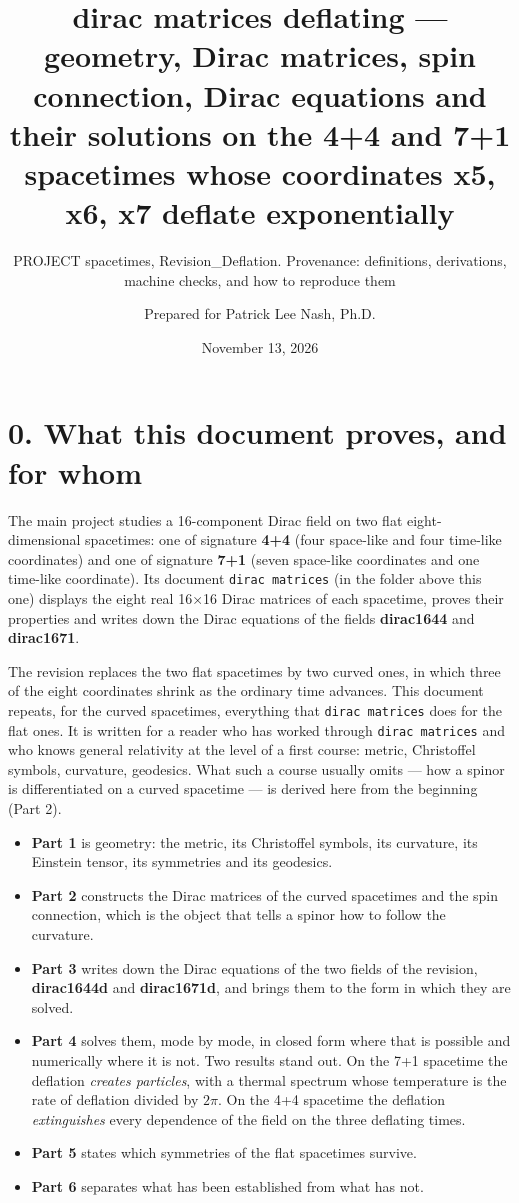 \documentclass[
  10pt,
]{article}
\title{dirac matrices deflating --- geometry, Dirac matrices, spin
connection, Dirac equations and their solutions on the 4+4 and 7+1
spacetimes whose coordinates x5, x6, x7 deflate exponentially}
\subtitle{PROJECT spacetimes, Revision\_Deflation. Provenance:
definitions, derivations, machine checks, and how to reproduce them}
\author{Prepared for Patrick Lee Nash, Ph.D.}
\date{November 13, 2026}
\providecommand{\tightlist}{%
  \setlength{\itemsep}{0pt}\setlength{\parskip}{0pt}}
\begin{document}
\maketitle

\hypertarget{what-this-document-proves-and-for-whom}{%
\section{0. What this document proves, and for
whom}\label{what-this-document-proves-and-for-whom}}

The main project studies a 16-component Dirac field on two flat
eight-dimensional spacetimes: one of signature \textbf{4+4} (four
space-like and four time-like coordinates) and one of signature
\textbf{7+1} (seven space-like coordinates and one time-like
coordinate). Its document \texttt{dirac\ matrices} (in the folder above
this one) displays the eight real 16×16 Dirac matrices of each
spacetime, proves their properties and writes down the Dirac equations
of the fields \textbf{dirac1644} and \textbf{dirac1671}.

The revision replaces the two flat spacetimes by two curved ones, in
which three of the eight coordinates shrink as the ordinary time
advances. This document repeats, for the curved spacetimes, everything
that \texttt{dirac\ matrices} does for the flat ones. It is written for
a reader who has worked through \texttt{dirac\ matrices} and who knows
general relativity at the level of a first course: metric, Christoffel
symbols, curvature, geodesics. What such a course usually omits --- how
a spinor is differentiated on a curved spacetime --- is derived here
from the beginning (Part 2).

\begin{itemize}
\tightlist
\item
  \textbf{Part 1} is geometry: the metric, its Christoffel symbols, its
  curvature, its Einstein tensor, its symmetries and its geodesics.
\item
  \textbf{Part 2} constructs the Dirac matrices of the curved spacetimes
  and the spin connection, which is the object that tells a spinor how
  to follow the curvature.
\item
  \textbf{Part 3} writes down the Dirac equations of the two fields of
  the revision, \textbf{dirac1644d} and \textbf{dirac1671d}, and brings
  them to the form in which they are solved.
\item
  \textbf{Part 4} solves them, mode by mode, in closed form where that
  is possible and numerically where it is not. Two results stand out. On
  the 7+1 spacetime the deflation \emph{creates particles}, with a
  thermal spectrum whose temperature is the rate of deflation divided by
  \(2\pi\). On the 4+4 spacetime the deflation \emph{extinguishes} every
  dependence of the field on the three deflating times.
\item
  \textbf{Part 5} states which symmetries of the flat spacetimes
  survive.
\item
  \textbf{Part 6} separates what has been established from what has not.
\end{itemize}
\end{document}
